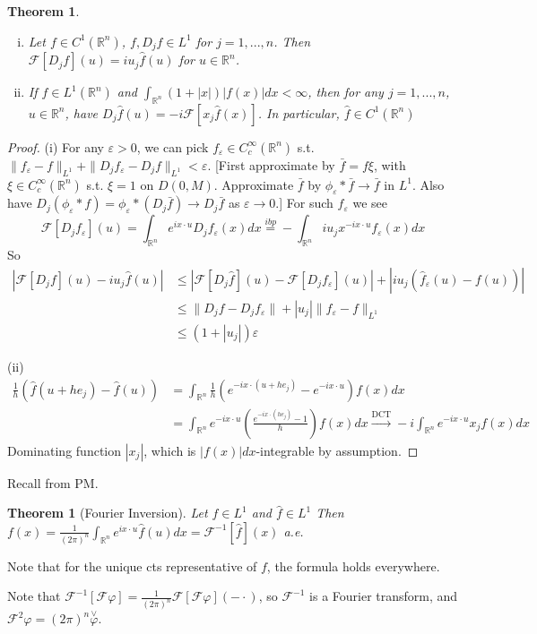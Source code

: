 \documentclass{article}
\newcommand{\e}{\varepsilon}
\theoremstyle{definition}
\theoremstyle{remark}
\theoremstyle{plain}
\newtheorem{thm}[defn]{Theorem}
\newcommand{\RR}{\mathbb{R}}
\begin{document}
\begin{thm}\
    \begin{enumerate}[(i)]
        \item Let $f\in C^1(\RR^n)$, $f,D_jf\in L^1$ for $j=1,...,n$. Then $\mathcal F[D_jf](u)=iu_j\hat f(u)$ for $u\in\RR^n$.
        \item If $f\in L^1(\RR^n)$ and $\int_{\RR^n}(1+|x|)|f(x)|dx<\infty$, then for any $j=1,...,n$, $u\in\RR^n$, have $D_j\hat f(u)=-i\mathcal F[x_j\hat f(x)]$. In particular, $\hat f\in C^1(\RR^n)$
    \end{enumerate}
\end{thm}
\begin{proof}
    (i) For any $\e>0$, we can pick $f_\e\in C^\infty_c(\RR^n)$ s.t.  $\|f_\e-f\|_{L^1}+\|D_jf_\e-D_jf\|_{L^1}<\e$. [First approximate by $\bar f=f\xi$, with $\xi\in C_c^\infty(\RR^n)$ s.t. $\xi=1$ on $D(0,M)$. Approximate $\bar f$ by $\phi_\e\ast \bar f\to \bar f$ in $L^1$. Also have $D_j(\phi_\e\ast f)=\phi_\e\ast(D_j\bar f)\to D_j\bar f$ as $\e\to 0$.] For such $f_\e$ we see
    \[\mathcal F[D_jf_\e](u)=\int_{\RR^n}e^{ix\cdot u}D_jf_\e(x)dx\overset{ibp}{=}-\int_{\RR^n}iu_jx^{-ix\cdot u}f_\e(x)dx\]
    So \begin{align*}
        |\mathcal F[D_jf](u)-iu_j\hat f(u)|&\le |\mathcal F[D_j\hat f](u)-\mathcal F[D_jf_\e](u)|+|iu_j(\hat f_\e(u)-f(u))|\\
        &\le \|D_jf-D_jf_\e\|+|u_j|\|f_\e-f\|_{L^1}\\ &\le (1+|u_j|)\e
    \end{align*}

    (ii) \begin{align*}
        \frac1h(\hat f(u+he_j)-\hat f(u))&=\int_{\RR^n}\frac1h(e^{-ix\cdot(u+he_j)}-e^{-ix\cdot u})f(x)dx\\
        &=\int_{\RR^n}e^{-ix\cdot u}(\frac{e^{-ix\cdot(he_j)}-1}{h})f(x)dx\overset{\text{DCT}}{\rightarrow}-i\int_{\RR^n}e^{-ix\cdot u}x_jf(x)dx
    \end{align*}
    Dominating function $|x_j|$, which is $|f(x)|dx$-integrable by assumption.
\end{proof}
Recall from PM.
\begin{thm}[Fourier Inversion]
    Let $f\in L^1$ and $\hat f\in L^1$ Then $f(x)=\frac{1}{(2\pi)^n}\int_{\RR^n}e^{ix\cdot u}\hat f(u)dx=\mathcal F^{-1}[\hat f](x)$ a.e.
\end{thm}
Note that for the unique cts representative of $f$, the formula holds everywhere.

Note that $\mathcal F^{-1}[\mathcal F\varphi]=\frac{1}{(2\pi)^n}\mathcal F[\mathcal F\varphi](-\cdot)$, so $\mathcal F^{-1}$ is a Fourier transform, and $\mathcal F^2\varphi=(2\pi)^n\overset{\vee}{\varphi}$.
\end{document}
